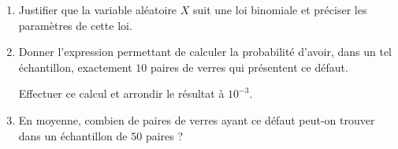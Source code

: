 \documentclass[11pt,a4paper,french]{article}
\begin{document}
\medskip

\begin{enumerate}
\item Justifier que la variable aléatoire $X$ suit une loi binomiale et préciser les paramètres de cette loi.
\item Donner l'expression permettant de calculer la probabilité d'avoir, dans un tel échantillon, exactement $10$ paires de verres qui présentent ce défaut.

Effectuer ce calcul et arrondir le résultat à $10^{-3}$.
\item En moyenne, combien de paires de verres ayant ce défaut peut-on trouver dans un échantillon de $50$ paires ?
\end{enumerate}
\end{document}
